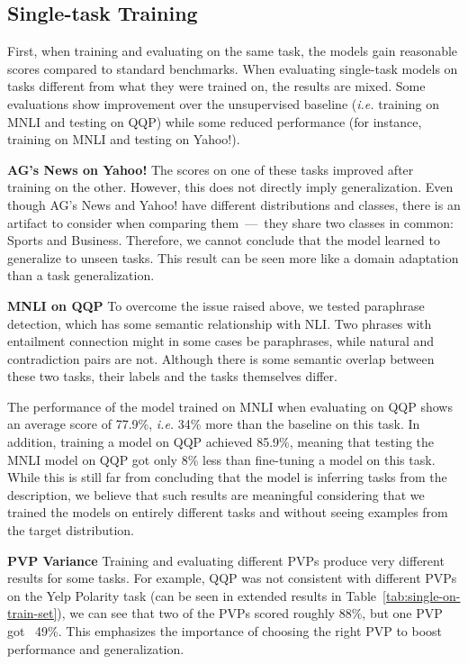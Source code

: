 \documentclass[11pt,a4paper]{article}
\newcommand{\subtitle}[1]{\vspace{5pt}\noindent\textbf{#1}\quad}
\begin{document}
\subsection{Single-task Training}
First, when training and evaluating on the same task, the models gain reasonable scores compared to standard benchmarks.
When evaluating single-task models on tasks different from what they were trained on, the results are mixed.
Some evaluations show improvement over the unsupervised baseline (\textit{i.e.} training on MNLI and testing on QQP)
while some reduced performance (for instance, training on MNLI and testing on Yahoo!).

\subtitle{AG's News on Yahoo!}
The scores on one of these tasks improved after training on the other.
However, this does not directly imply generalization.
Even though AG's News and Yahoo! have different distributions and classes, there is an artifact to consider when comparing them~---~they share two classes in common: Sports and Business.
Therefore, we cannot conclude that the model learned to generalize to unseen tasks.
This result can be seen more like a domain adaptation than a task generalization.

\subtitle{MNLI on QQP}
To overcome the issue raised above, we tested paraphrase detection, which has some semantic relationship with NLI.
Two phrases with entailment connection might in some cases be paraphrases, while natural and contradiction pairs are not.
Although there is some semantic overlap between these two tasks, their labels and the tasks themselves differ.

The performance of the model trained on MNLI when evaluating on QQP shows an average score of 77.9\%,
\textit{i.e.} 34\% more than the baseline on this task.
In addition, training a model on QQP achieved 85.9\%,
meaning that testing the MNLI model on QQP got only 8\% less than fine-tuning a model on this task.
While this is still far from concluding that the model is inferring tasks from the description, we believe that such results are meaningful considering that we trained the models on entirely different tasks and without seeing examples from the target distribution.

\subtitle{PVP Variance}
Training and evaluating different PVPs produce very different results for some tasks.
For example, QQP was not consistent with different PVPs on the Yelp Polarity task (can be seen in extended results in Table~\ref{tab:single-on-train-set}), we can see that two of the PVPs scored roughly 88\%, but one PVP got ~49\%.
This emphasizes the importance of choosing the right PVP to boost performance and generalization.
\end{document}
